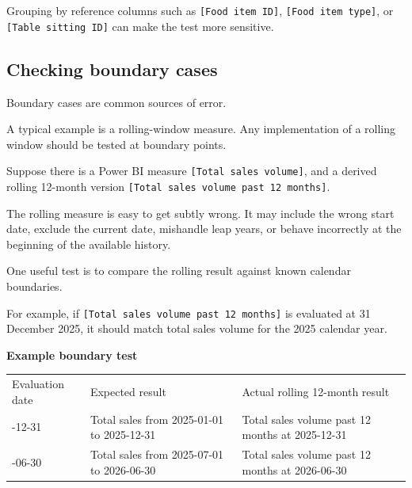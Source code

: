 \documentclass[10pt,openany,10pt]{book}
\newcounter{none}
\let\podeToprule\toprule
\let\podeMidrule\midrule
\let\podeBottomrule\bottomrule
\renewcommand{\toprule}{\arrayrulecolor{pbiGrid}\podeToprule}
\renewcommand{\midrule}{\arrayrulecolor{pbiGrid}\podeMidrule}
\renewcommand{\bottomrule}{\arrayrulecolor{pbiGrid}\podeBottomrule}
\begin{document}
Grouping by reference columns such as \texttt{{[}Food\ item\ ID{]}},
\texttt{{[}Food\ item\ type{]}}, or \texttt{{[}Table\ sitting\ ID{]}}
can make the test more sensitive.

\subsection{Checking boundary cases}\label{checking-boundary-cases}

Boundary cases are common sources of error.

A typical example is a rolling-window measure. Any implementation of a
rolling window should be tested at boundary points.

Suppose there is a Power BI measure \texttt{{[}Total\ sales\ volume{]}},
and a derived rolling 12-month version
\texttt{{[}Total\ sales\ volume\ past\ 12\ months{]}}.

The rolling measure is easy to get subtly wrong. It may include the
wrong start date, exclude the current date, mishandle leap years, or
behave incorrectly at the beginning of the available history.

One useful test is to compare the rolling result against known calendar
boundaries.

For example, if \texttt{{[}Total\ sales\ volume\ past\ 12\ months{]}} is
evaluated at 31 December 2025, it should match total sales volume for
the 2025 calendar year.

\textbf{Example boundary test}

{\def\LTcaptype{none} %
\begin{longtable}[]{@{}
  >{\raggedright\arraybackslash}p{}
  >{\raggedright\arraybackslash}p{}
  >{\raggedright\arraybackslash}p{}@{}}
\toprule\noalign{}
\begin{minipage}[b]{\linewidth}\raggedright
Evaluation date
\end{minipage} & \begin{minipage}[b]{\linewidth}\raggedright
Expected result
\end{minipage} & \begin{minipage}[b]{\linewidth}\raggedright
Actual rolling 12-month result
\end{minipage} \\
\midrule\noalign{}
\endhead
\bottomrule\noalign{}
\endlastfoot
2025-12-31 & Total sales from 2025-01-01 to 2025-12-31 & Total sales
volume past 12 months at 2025-12-31 \\
2026-06-30 & Total sales from 2025-07-01 to 2026-06-30 & Total sales
volume past 12 months at 2026-06-30 \\
\end{longtable}
}
\end{document}
